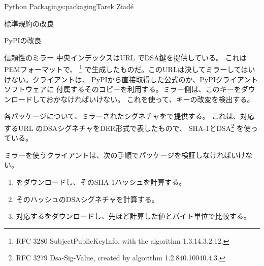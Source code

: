 \begin{aosachapter}{Python Packaging}{s:packaging}{Tarek Ziad\'{e}}
\begin{aosasect1}{標準規約の改良}
\begin{aosasect2}{PyPIの改良}
\begin{aosasect3}{信頼性のミラー}
中央インデックスはURL でDSA鍵を提供している。
これはPEMフォーマットで、
\footnote{RFC 3280 SubjectPublicKeyInfo, with the algorithm 1.3.14.3.2.12.}
で生成したものだ。このURLは決してミラーしてはいけない。クライアントは、
PyPIから直接取得した公式のか、PyPIクライアントソフトウェアに
付属するそのコピーを利用する。ミラー側は、このキーをダウンロードしておかなければいけない。
これを使って、キーの改変を検出する。

各パッケージについて、ミラーされたシグネチャをで提供する。
これは、対応するURL のDSAシグネチャをDER形式で表したもので、
SHA-1とDSA\footnote{RFC 3279 Dsa-Sig-Value, created by algorithm   1.2.840.10040.4.3.}
を使っている。

ミラーを使うクライアントは、次の手順でパッケージを検証しなければいけない。

\begin{enumerate}

  \item {}をダウンロードし、そのSHA-1ハッシュを計算する。

  \item そのハッシュのDSAシグネチャを計算する。

  \item 対応するをダウンロードし、先ほど計算した値とバイト単位で比較する。


\end{enumerate}
\end{aosasect3}
\end{aosasect2}
\end{aosasect1}
\end{aosachapter}
